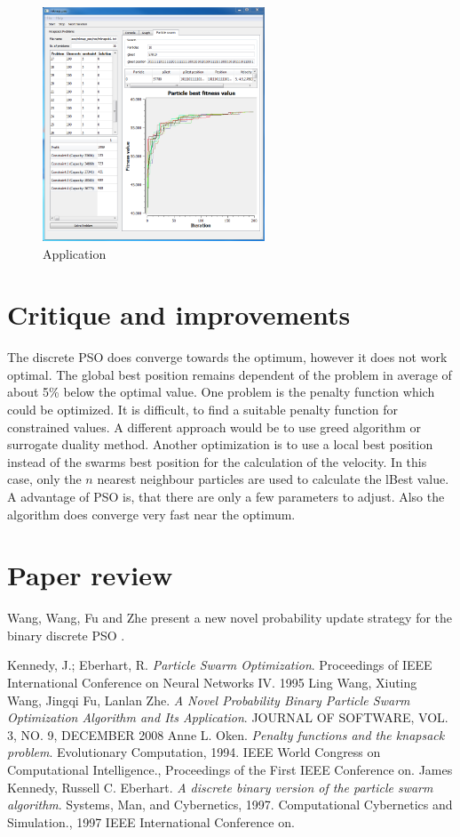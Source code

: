 \documentclass{article}
\begin{document}
\begin{figure}[H]
    \centering
    \includegraphics[width=250px]{images/image_main.PNG}
    \caption{Application}
    \label{fig-app}
\end{figure}

\section{Critique and improvements}
\label{lbl-impr}
The discrete PSO does converge towards the optimum, however it does not work optimal. The global best position remains dependent of the problem in average of about 5\% below the optimal value. One problem is the penalty function which could be optimized. It is difficult, to find a suitable penalty function for constrained values. A different approach would be to use greed algorithm or surrogate duality method. Another optimization is to use a local best position instead of the swarms best position for the calculation of the velocity. In this case, only the $n$ nearest neighbour particles are used to calculate the lBest value. A advantage of PSO is, that there are only a few parameters to adjust. Also the algorithm does converge very fast near the optimum.

\section{Paper review}
Wang, Wang, Fu and Zhe present a new novel probability update strategy for the binary discrete PSO \cite{bib-novel}.

\newpage

\begin{thebibliography}{99}
		Kennedy, J.; Eberhart, R.
		\emph{Particle Swarm Optimization}.
		Proceedings of IEEE International Conference on Neural Networks IV.
		1995
		Ling Wang, Xiuting Wang, Jingqi Fu, Lanlan Zhe.
	  	\emph{A Novel Probability Binary Particle Swarm Optimization Algorithm and Its Application}.
	  	JOURNAL OF SOFTWARE, VOL. 3, NO. 9, DECEMBER 2008
		Anne L. Oken.
		\emph{Penalty functions and the knapsack problem}.
		Evolutionary Computation, 1994. IEEE World Congress on Computational Intelligence., Proceedings of the First IEEE Conference on.
		James Kennedy, Russell C. Eberhart.
		\emph{A discrete binary version of the particle swarm algorithm}.
		Systems, Man, and Cybernetics, 1997. Computational Cybernetics and Simulation., 1997 IEEE International Conference on.
\end{thebibliography}
\end{document}
